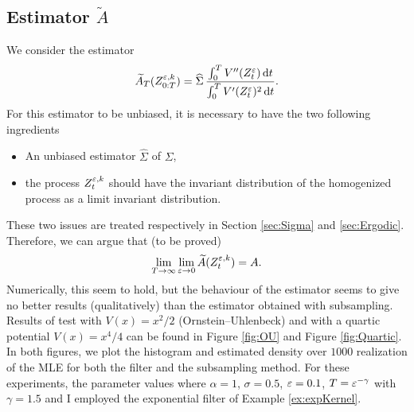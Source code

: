 \documentclass[10pt]{article}
\begin{document}
\subsection{Estimator $\widetilde A$}
We consider the estimator
\begin{equation}
	\widetilde A_T(Z_{0:T}^{\varepsilon,k}) = \widehat \Sigma \, \frac{\int_0^T  V''(Z_t^\varepsilon) \,\mathrm{d} t}{\int_0^T V'(Z_t^\varepsilon)^2 \,\mathrm{d} t}.
\end{equation}
For this estimator to be unbiased, it is necessary to have the two following ingredients
\begin{itemize}[label=-]
	\item An unbiased estimator $\widehat \Sigma$ of $\Sigma$,
	\item the process $Z_t^{\varepsilon,k}$ should have the invariant distribution of the homogenized process as a limit invariant distribution.
\end{itemize}
These two issues are treated respectively in Section \ref{sec:Sigma} and \ref{sec:Ergodic}. Therefore, we can argue that (to be proved)
\begin{equation}
	\lim_{T\to\infty}\lim_{\varepsilon \to 0} \widetilde A(Z_t^{\varepsilon,k}) = A.
\end{equation}
Numerically, this seem to hold, but the behaviour of the estimator seems to give no better results (qualitatively) than the estimator obtained with subsampling. Results of test with $V(x) = x^2/2$ (Ornstein--Uhlenbeck) and with a quartic potential $V(x) = x^4 / 4$ can be found in Figure \ref{fig:OU} and Figure \ref{fig:Quartic}. In both figures, we plot the histogram and estimated density over $1000$ realization of the MLE for both the filter and the subsampling method. For these experiments, the parameter values where $\alpha = 1$, $\sigma = 0.5$, $\varepsilon=0.1$, $T = \varepsilon^{-\gamma}$ with $\gamma = 1.5$ and I employed the exponential filter of Example \ref{ex:expKernel}.
\end{document}
